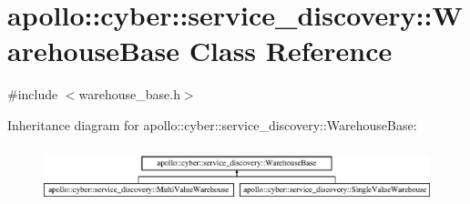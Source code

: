 \hypertarget{classapollo_1_1cyber_1_1service__discovery_1_1WarehouseBase}{\section{apollo\-:\-:cyber\-:\-:service\-\_\-discovery\-:\-:Warehouse\-Base Class Reference}
\label{classapollo_1_1cyber_1_1service__discovery_1_1WarehouseBase}
}


{\ttfamily \#include $<$warehouse\-\_\-base.\-h$>$}

Inheritance diagram for apollo\-:\-:cyber\-:\-:service\-\_\-discovery\-:\-:Warehouse\-Base\-:\begin{figure}[H]
\begin{center}
\leavevmode
\includegraphics[height=1.637427cm]{classapollo_1_1cyber_1_1service__discovery_1_1WarehouseBase}
\end{center}
\end{figure}
